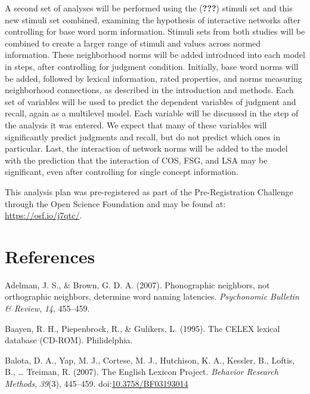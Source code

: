\documentclass[english,man]{apa6}
\theoremstyle{definition}
\theoremstyle{definition}
\theoremstyle{definition}
\theoremstyle{remark}
\begin{document}
A second set of analyses will be performed using the ({\textbf{???}})
stimuli set and this new stimuli set combined, examining the hypothesis
of interactive networks after controlling for base word norm
information. Stimuli sets from both studies will be combined to create a
larger range of stimuli and values across normed information. These
neighborhood norms will be added introduced into each model in steps,
after controlling for judgment condition. Initially, base word norms
will be added, followed by lexical information, rated properties, and
norms measuring neighborhood connections, as described in the
introduction and methods. Each set of variables will be used to predict
the dependent variables of judgment and recall, again as a multilevel
model. Each variable will be discussed in the step of the analysis it
was entered. We expect that many of these variables will significantly
predict judgments and recall, but do not predict which ones in
particular. Last, the interaction of network norms will be added to the
model with the prediction that the interaction of COS, FSG, and LSA may
be significant, even after controlling for single concept information.

This analysis plan was pre-registered as part of the Pre-Registration
Challenge through the Open Science Foundation and may be found at:
\url{https://osf.io/j7qtc/}.

\newpage

\section{References}\label{references}

\setlength{\parindent}{-0.5in} \setlength{\leftskip}{0.5in}

\hypertarget{refs}{}
\hypertarget{ref-Adelman2007}{}
Adelman, J. S., \& Brown, G. D. A. (2007). Phonographic neighbors, not
orthographic neighbors, determine word naming latencies.
\emph{Psychonomic Bulletin \& Review}, \emph{14}, 455--459.

\hypertarget{ref-Baayen1995}{}
Baayen, R. H., Piepenbrock, R., \& Gulikers, L. (1995). The CELEX
lexical database (CD-ROM). Philidelphia.

\hypertarget{ref-Balota2007}{}
Balota, D. A., Yap, M. J., Cortese, M. J., Hutchison, K. A., Kessler,
B., Loftis, B., \ldots{} Treiman, R. (2007). The English Lexicon
Project. \emph{Behavior Research Methods}, \emph{39}(3), 445--459.
doi:\href{https://doi.org/10.3758/BF03193014}{10.3758/BF03193014}
\end{document}
